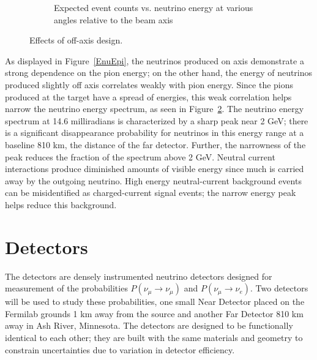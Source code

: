 \begin{figure}[t]
\begin{subfigure}[c]{0.47\textwidth}
                \caption{Expected \numu event counts vs. neutrino energy at various angles relative to the beam axis}
                \label{fluxEnu}

        \end{subfigure}
        \caption{Effects of off-axis design.}
\end{figure}As displayed in Figure~\ref{EnuEpi}, the neutrinos produced on axis demonstrate a strong dependence on the pion energy; on the other hand, the energy of neutrinos produced slightly off axis correlates weakly with pion energy.  Since the pions produced at the target have a spread of energies, this weak correlation helps narrow the neutrino energy spectrum, as seen in Figure~\ref{fluxEnu}.  The neutrino energy spectrum at 14.6 milliradians is characterized by a sharp peak near 2 GeV; there is a significant disappearance probability for neutrinos in this energy range at a baseline 810 km, the distance of the far detector.  Further, the narrowness of the peak reduces the fraction of the spectrum above 2 GeV.  Neutral current interactions produce diminished amounts of visible energy since much is carried away by the outgoing neutrino.  High energy neutral-current background events can be misidentified as charged-current signal events; the narrow energy peak helps reduce this background.  
 
\section{\nova Detectors}
\label{sec:detectors}
The \nova detectors are densely instrumented neutrino detectors designed for measurement of the probabilities $P(\nu_\mu \rightarrow \nu_\mu)$ and $P(\nu_\mu \rightarrow \nu_e)$.  Two detectors will be used to study these probabilities, one small Near Detector placed on the Fermilab grounds 1 km away from the \numi source and another Far Detector 810 km away in Ash River, Minnesota.  The detectors are designed to be functionally identical to each other; they are built with the same materials and geometry to constrain uncertainties due to variation in detector efficiency. 

